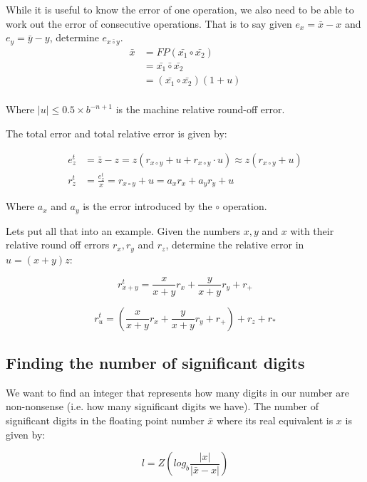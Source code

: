 While it is useful to know the error of one operation, we also need to be able
to work out the error of consecutive operations. That is to say given $e_x =
\bar{x} - x$ and  $e_y = \bar{y} - y$, determine $e_{x \bar{\circ} y}$.
\[
  \begin{split}
  \bar{x} &= FP(\bar{x_1} \circ \bar{x_2})\\
          &= \bar{x_1} \bar{\circ} \bar{x_2}\\
          &= (\bar{x_1} \circ \bar{x_2})(1 + u)\\
  \end{split}
\]

Where $|u| \leq 0.5 \times b^{-n + 1}$ is the machine relative
round-off error.

The total error and total relative error is given by:

\[
\begin{split}
  e^t_z &= \bar{z} - z = z(r_{x \circ y} + u + r_{x \circ y} \cdot
  u) \approx z(r_{x \circ y} + u)\\
  r^t_z &= \frac{e^t_z}{x} = r_{x \circ y} + u = a_xr_x + a_yr_y + u
\end{split}
\]

Where $a_x$ and $a_y$ is the error introduced by the $\circ$ operation.

Lets put all that into an example. Given the numbers $x,y$ and $x$ with their
relative round off errors $r_x, r_y$ and $r_z$, determine the relative error in
$u = (x + y)z$:

\[
  r^t_{x + y} = \frac{x}{x + y}r_x + \frac{y}{x + y}r_y + r_+
\]

\[
  r^t_{u} = \left(\frac{x}{x + y}r_x + \frac{y}{x + y}r_y + r_+\right) + r_z + r_*
\]


\subsection{Finding the number of significant digits}

We want to find an integer that represents how many digits in our number are
non-nonsense (i.e. how many significant digits we have). The number of
significant digits in the floating point number $\bar{x}$ where its real
equivalent is $x$ is given by:


\[
  l = Z(log_b\frac{|x|}{|\bar{x} - x|})
\]

